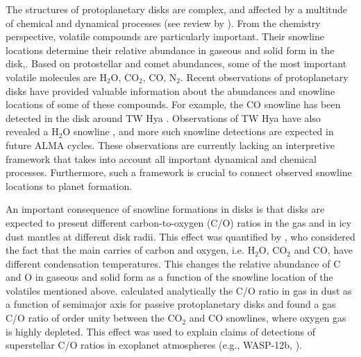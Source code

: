 \documentclass[apj]{emulateapj}
\newcommand{\emgr}[1]{\emph{ \color{gray} #1}}
\begin{document}
The structures of protoplanetary disks are complex, and affected by a multitude of chemical and dynamical processes (see review by \citealt{henning13}). From the chemistry perspective, volatile compounds are particularly important. Their snowline locations determine their relative abundance in gaseous and solid form in the disk,. Based on protostellar and comet abundances, some of the most important volatile molecules are H$_2$O, CO$_2$, CO, N$_2$. Recent observations of protoplanetary disks have provided valuable information about the abundances and snowline locations of some of these compounds. For example, the CO snowline has been detected in the disk around TW Hya \citep{qi13}. Observations of TW Hya have also revealed a H$_2$O snowline \citep{zhang13}, and more such snowline detections are expected in future ALMA cycles. These observations are currently lacking an interpretive framework that takes into account all important dynamical and chemical processes. Furthermore, such a framework is crucial to connect observed snowline locations to planet formation.





An important consequence of snowline formations in disks is that disks are expected to present different carbon-to-oxygen (C/O) ratios in the gas and in icy dust mantles at different disk radii. This effect was quantified by  \citet{oberg11}, who considered the fact that the main carries of carbon and oxygen, i.e. H$_2$O, CO$_2$ and CO, have different condensation temperatures. This changes the relative abundance of C and O in gaseous and solid form as a function of the snowline location of the volatiles mentioned above. \citet{oberg11} calculated analytically the C/O ratio in gas in dust as a function of semimajor axis for passive protoplanetary disks and found a gas C/O ratio of order unity between the CO$_2$ and CO snowlines, where oxygen gas is highly depleted. This effect was used to explain claims of detections of superstellar C/O ratios in exoplanet atmospheres (e.g., WASP-12b, \citealt{madhu11}). 
\end{document}
